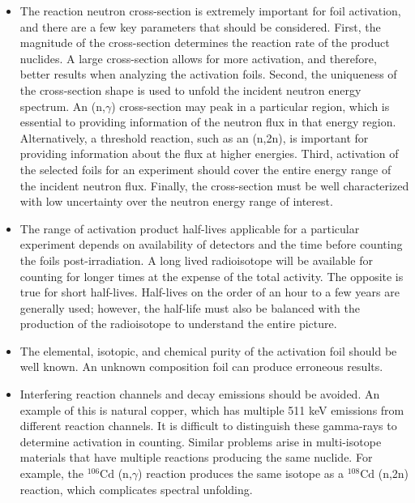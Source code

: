 \begin{itemize}
	\item The reaction neutron cross-section is extremely important for foil 
	activation, and there are a few key parameters that should be considered. 
	First, the magnitude of the cross-section determines the 
	reaction rate of the product nuclides. A large cross-section allows for 
	more activation, and therefore, better results when analyzing the activation 
	foils. Second, the uniqueness of the cross-section shape is used to unfold 
	the incident neutron energy spectrum. An (n,$\gamma$) cross-section may 
	peak in a particular region, which is essential to providing information of the 
	neutron flux in that energy region. Alternatively, a threshold reaction, 
	such as an (n,2n), is important for providing information about the flux at 
	higher energies. Third, activation of the selected foils for an experiment should cover  
	the entire energy range of the incident neutron flux. Finally, the cross-section
	must be well characterized with low uncertainty over the neutron energy range of
	interest.   
    
    \item The range of activation product half-lives applicable for a particular experiment depends on availability of detectors and the time before counting the foils post-irradiation. A long lived radioisotope 
    will be available for counting for longer times at the expense of the total activity. The opposite is true for short 
    half-lives. Half-lives on the order of an hour to a few years are generally used; however, the half-life must also be balanced with the 
    production of the radioisotope to understand the entire picture. 
    
    \item The elemental, isotopic, and chemical purity of the activation foil should be 
    well known. An unknown composition foil can produce erroneous 
    results. 
    
    \item Interfering reaction channels and decay emissions should be avoided. 
    An example of this is natural copper, which has multiple 511 keV emissions 
    from different reaction channels. It is difficult to distinguish these 
    gamma-rays to determine activation in counting. Similar problems arise in 
    multi-isotope materials that have multiple reactions producing the same 
    nuclide. For example, the $\mathrm{^{106}Cd}$ (n,$\gamma$) reaction produces the same 
    isotope as a $\mathrm{^{108}Cd}$ (n,2n) reaction, which complicates spectral unfolding. 


\end{itemize}
